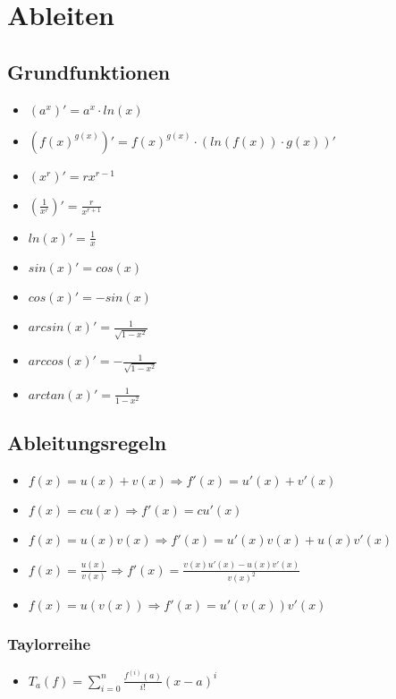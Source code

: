 \section{Ableiten}

\subsection{Grundfunktionen}
\begin{itemize}
    \item $(a^x)' = a^x \cdot ln(x)$
    \item $(f(x)^{g(x)})' = f(x)^{g(x)} \cdot (ln(f(x)) \cdot g(x))'$
	\item $(x^r)' = r x^{r-1}$
	\item $(\frac{1}{x^r})' = \frac{r}{x^{r+1}}$
	\item $ln(x)' = \frac{1}{x}$
	\item $sin(x)' = cos(x)$
	\item $cos(x)' = -sin(x)$
	\item $arcsin(x)' = \frac{1}{\sqrt{1-x^2}}$
	\item $arccos(x)' = - \frac{1}{\sqrt{1-x^2}}$
	\item $arctan(x)' = \frac{1}{1-x^2}$
\end{itemize}

\subsection{Ableitungsregeln}
\begin{itemize}
	\item $f(x) = u(x) + v(x) \Rightarrow f'(x) = u'(x) + v'(x)$
	\item $f(x) = c u(x) \Rightarrow f'(x) = c u'(x)$
	\item $f(x) = u(x) v(x) \Rightarrow f'(x) = u'(x) v(x) + u(x) v'(x)$
	\item $f(x) = \frac{u(x)}{v(x)} \Rightarrow f'(x) = \frac{v(x) u'(x) - u(x) v'(x)}{v(x)^2}$
	\item $f(x) = u(v(x)) \Rightarrow f'(x) = u'(v(x)) v'(x)$
\end{itemize}
\subsubsection{Taylorreihe}
\begin{itemize}
	\item $T_a(f) = \sum_{i=0}^n \frac{f^{(i)}(a)}{i!}(x-a)^i$
\end{itemize}

